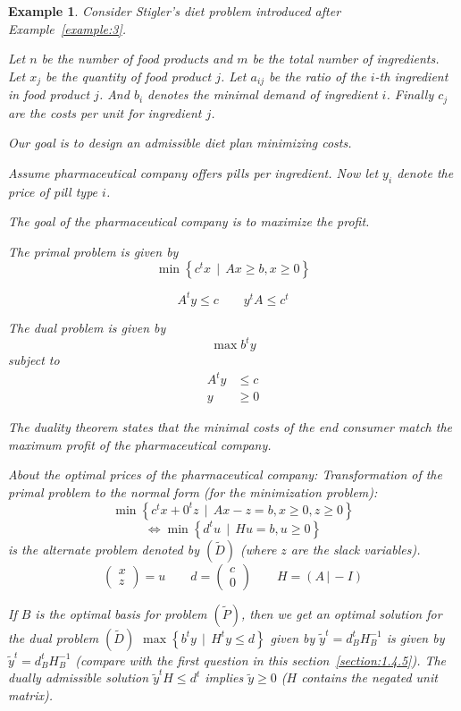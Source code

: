 \documentclass[a4paper]{article}
\numberwithin{lecref}{subsection}
\newcounter{exercises}
\newtheorem{example}[exercises]{Example}
\newcommand{\SetDef}[2]{\left\{#1\,\mid\,#2\right\}}
\begin{document}
\begin{example}
	Consider Stigler's diet problem introduced after Example~\ref{example:3}.

	Let $n$ be the number of food products and $m$ be the total number of ingredients.
	Let $x_j$ be the quantity of food product $j$.
	Let $a_{ij}$ be the ratio of the $i$-th ingredient in food product $j$.
	And $b_i$ denotes the minimal demand of ingredient $i$.
	Finally $c_j$ are the costs per unit for ingredient $j$.

	Our goal is to design an admissible diet plan minimizing costs.

	Assume pharmaceutical company offers pills per ingredient.
	Now let $y_i$ denote the price of pill type $i$.

	The goal of the pharmaceutical company is to maximize the profit.

	The primal problem is given by
	\[ \min\SetDef{c^t x}{Ax \geq b, x \geq 0} \]

	\[ A^t y \leq c \qquad y^t A \leq c^t \]

	The dual problem is given by
	\[ \max b^t y \]
	subject to
	\begin{align*}
		A^t y &\leq c \\
		y &\geq 0
	\end{align*}

	The duality theorem states that the minimal costs of the end consumer match the maximum profit of the pharmaceutical company.

	About the optimal prices of the pharmaceutical company:
	Transformation of the primal problem to the normal form (for the minimization problem):
	\[ \min\SetDef{c^tx + 0^t z}{Ax - z = b, x \geq 0, z \geq 0} \]
	\[ \iff \min\SetDef{d^t u}{Hu = b, u \geq 0} \]
	is the alternate problem denoted by $(\tilde D)$ (where $z$ are the slack variables).
	\[ \begin{pmatrix} x \\ z \end{pmatrix} = u \qquad d = \begin{pmatrix} c \\ 0 \end{pmatrix} \qquad H = (A \,|\, -I) \]

	If $B$ is the optimal basis for problem $(\tilde P)$, then we get an optimal solution for the dual problem $(\tilde D)$ $\max\SetDef{b^ty}{H^t y \leq d}$ given by $\tilde y^t = d_B^t H_B^{-1}$ is given by $\tilde y^t = d_B^t H_B^{-1}$ (compare with the first question in this section~\ref{section:1.4.5}). The dually admissible solution $\tilde y^t H \leq d^t$ implies $\tilde y \geq 0$ ($H$ contains the negated unit matrix).


\end{example}
\end{document}
